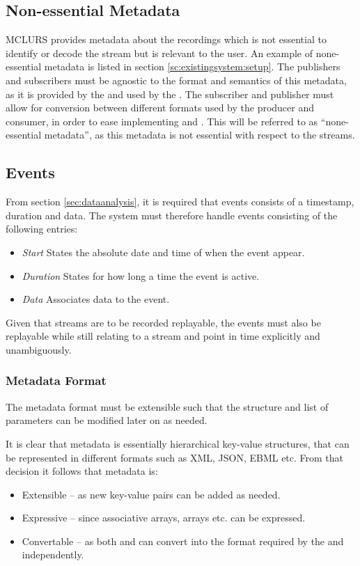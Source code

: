 \subsection{Non-essential Metadata}
\ac{MCLURS} provides metadata about the recordings which is not essential to identify or decode the stream but is relevant to the user. An example of none-essential metadata is listed in section \ref{sc:existingsystem:setup}.
The publishers and subscribers must be agnostic to the format and semantics of this metadata, as it is provided by the  and used by the . The subscriber and publisher must allow for conversion between different formats used by the producer and consumer, in order to ease implementing  and .
This will be referred to as ``none-essential metadata'', as this metadata is not essential with respect to the streams.\\

\subsection{Events} \label{sec:analysis:event}
From section \ref{sec:dataanalysis}, it is required that events consists of a timestamp, duration and data. The system must therefore handle events consisting of the following entries:
\begin{itemize}
	\item \textit{Start} States the absolute date and time of when the event appear. 
	\item \textit{Duration} States for how long a time the event is active.
	\item \textit{Data} Associates data to the event. 
\end{itemize}

Given that streams are to be recorded replayable, the events must also be replayable while still relating to a stream and point in time explicitly and unambiguously.


\subsubsection{Metadata Format}
The metadata format must be extensible such that the structure and list of parameters can be modified later on as needed.

It is clear that metadata is essentially hierarchical key-value structures, that can be represented in different formats such as XML, JSON, EBML etc.  From that decision it follows that metadata is:
\begin{itemize}
	\item Extensible -- as new key-value pairs can be added as needed.
	\item Expressive -- since associative arrays, arrays etc. can be expressed.
	\item Convertable -- as both  and  can convert into the format required by the  and  independently.
\end{itemize}

